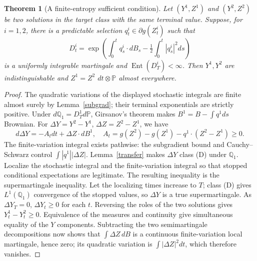 \documentclass[11pt]{article}
\newtheorem{theorem}{Theorem}
\newcommand{\Prb}{\mathbb P}
\newcommand{\Q}{\mathbb Q}
\DeclareMathOperator{\Ent}{Ent}
\begin{document}
\begin{theorem}[A finite-entropy sufficient condition]\label{conditional}
Let $(Y^1,Z^1)$ and $(Y^2,Z^2)$ be two solutions in the target class
with the same terminal value. Suppose, for $i=1,2$, there is a predictable
selection $q^i_t\in\partial g(Z^i_t)$ such that
\[
 D^i_t=\exp\left(\int_0^t q^i_s\cdot dB_s
                  -\tfrac12\int_0^t|q^i_s|^2ds\right)
\]
is a uniformly integrable martingale and $\Ent(D^i_T)<\infty$.
Then $Y^1,Y^2$ are indistinguishable and $Z^1=Z^2$
$dt\otimes\Prb$ almost everywhere.
\end{theorem}
\begin{proof}
The quadratic variations of the displayed stochastic integrals are finite
almost surely by Lemma~\ref{subgrad}; their terminal exponentials are
strictly positive. Under $d\Q_1=D^1_Td\Prb$, Girsanov's theorem makes
$B^1=B-\int q^1ds$ Brownian. For
$\Delta Y=Y^2-Y^1$, $\Delta Z=Z^2-Z^1$, we have
\[
 d\Delta Y=-A_tdt+\Delta Z\cdot dB^1,
 \quad A_t=g(Z^2)-g(Z^1)-q^1\cdot(Z^2-Z^1)\geq0.
\]
The finite-variation integral exists pathwise: the subgradient bound and
Cauchy--Schwarz control $\int |q^1||\Delta Z|$.
Lemma~\ref{transfer} makes $\Delta Y$ class (D) under $\Q_1$.
Localize the stochastic integral and the finite-variation integral so that
stopped conditional expectations are legitimate. The resulting inequality
is the supermartingale inequality. Let the localizing times increase to
$T$; class (D) gives $L^1(\Q_1)$ convergence of the stopped values,
so $\Delta Y$ is a true supermartingale. As $\Delta Y_T=0$,
$\Delta Y_t\geq0$ for each $t$. Reversing the roles of the two
solutions gives $Y^1_t-Y^2_t\geq0$. Equivalence of the measures and
continuity give simultaneous equality of the $Y$ components.
Subtracting the two semimartingale decompositions now shows that
$\int\Delta Z\,dB$ is a continuous finite-variation local martingale,
hence zero; its quadratic variation is $\int|\Delta Z|^2dt$, which
therefore vanishes.
\end{proof}
\end{document}
